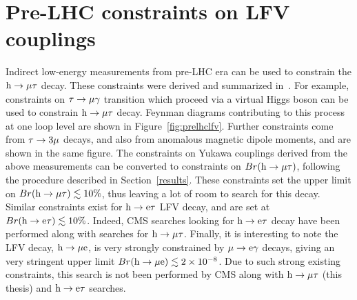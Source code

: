 \section{Pre-LHC constraints on LFV couplings}

Indirect low-energy measurements from pre-LHC era can be used to constrain the $\text{h} \to \mu \tau$ decay. These constraints were derived and summarized in~\cite{Harnik:2012pb}. For example, constraints on $\tau\rightarrow\mu\gamma$ transition which proceed via a virtual Higgs boson can be used to constrain $\text{h} \to \mu \tau$ decay. Feynman diagrams contributing to this process at one loop level are shown in Figure~\ref{fig:prelhclfv}. Further constraints come from $\tau\rightarrow 3\mu$ decays, and also from anomalous magnetic dipole moments, and are shown in the same figure. The constraints on Yukawa couplings derived from the above measurements can be converted to constraints on $Br(\text{h} \to \mu \tau)$, following the procedure described in Section~\ref{results}. These constraints set the upper limit on $Br(\text{h} \to \mu \tau)\lesssim 10\%$, thus leaving a lot of room to search for this decay. Similar constraints exist for $\text{h} \to \text{e} \tau$ LFV decay, and are set at $Br(\text{h} \to \text{e} \tau)\lesssim 10\%$. Indeed, CMS searches looking for $\text{h} \to \text{e} \tau$ decay have been performed along with searches for $\text{h} \to \mu \tau$. Finally, it is interesting to note the LFV decay, $\text{h} \to \mu \text{e}$, is very strongly constrained by $\mu\rightarrow\text{e}\gamma$ decays, giving an very stringent upper limit $Br(\text{h} \to \mu \text{e})\lesssim 2\times10^{-8}$. Due to such strong existing constraints, this search is not been performed by CMS along with $\text{h} \to \mu \tau$ (this thesis) and $\text{h} \to \text{e} \tau$ searches.           

